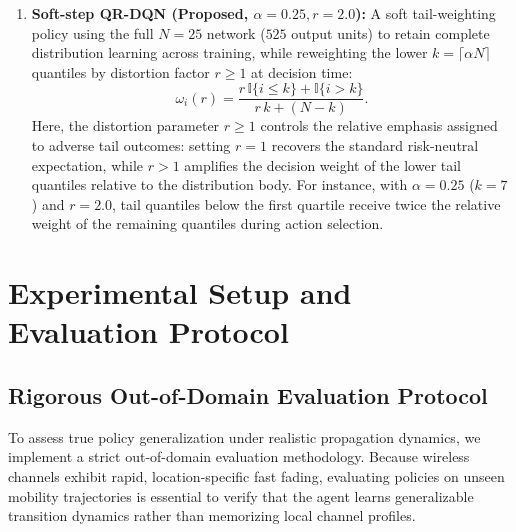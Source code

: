 \documentclass{ieeetmlcn}
\begin{document}
\begin{enumerate}
    \item \textbf{Soft-step QR-DQN (Proposed, $\alpha=0.25, r=2.0$):} A soft tail-weighting policy using the full $N=25$ network ($525$ output units) to retain complete distribution learning across training, while reweighting the lower $k = \lceil\alpha N\rceil$ quantiles by distortion factor $r \ge 1$ at decision time:
    \begin{equation}
    \omega_i(r) = \frac{r\,\mathbb{I}\{i\le k\} + \mathbb{I}\{i>k\}}{r\,k + (N-k)} .
    \label{eq:softstep}
    \end{equation}
    Here, the distortion parameter $r \ge 1$ controls the relative emphasis assigned to adverse tail outcomes: setting $r=1$ recovers the standard risk-neutral expectation, while $r > 1$ amplifies the decision weight of the lower tail quantiles relative to the distribution body. For instance, with $\alpha = 0.25$ ($k=7$) and $r=2.0$, tail quantiles below the first quartile receive twice the relative weight of the remaining quantiles during action selection.\end{enumerate}



\section{Experimental Setup and Evaluation Protocol}
\label{sec:setup}

\subsection{Rigorous Out-of-Domain Evaluation Protocol}
To assess true policy generalization under realistic propagation dynamics, we implement a strict out-of-domain evaluation methodology. Because wireless channels exhibit rapid, location-specific fast fading, evaluating policies on unseen mobility trajectories is essential to verify that the agent learns generalizable transition dynamics rather than memorizing local channel profiles.
\end{document}
